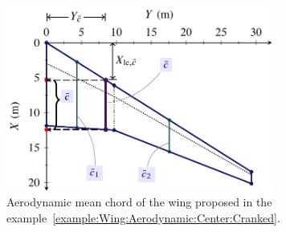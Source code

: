 \documentclass[[12pt,twoside]{book}
\begin{document}
%

%
\begin{figure}[t]%
    \includegraphics[width=0.78\textwidth]{Chapter_2/aerodynamic_center_of_a_cranked_wing/wing_ac_cranked_1_drawing_mac.pdf}
  \caption{
         Aerodynamic mean chord of the wing proposed in the example~\ref{example:Wing:Aerodynamic:Center:Cranked}.
  }
  \label{fig:Wing:Aerodynamic:Center:Cranked:MAC}%
\end{figure}
%
\end{document}
